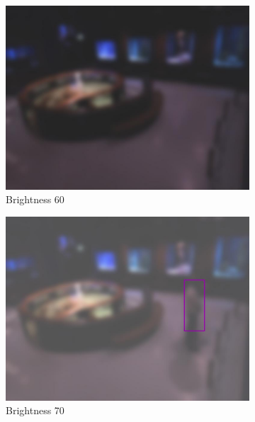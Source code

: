 \begin{figure}[H]
    \centering
    \begin{subfigure}{0.30\textwidth}
        \centering
        \includegraphics[width=\textwidth]{Images/DeviceImages/1st-iteration/hallvard-090224-141936-0-bright60.jpg}
        \caption{Brightness 60}
    \end{subfigure}
    \hfill
    \begin{subfigure}{0.30\textwidth}
        \centering
        \includegraphics[width=1\textwidth]{Images/DeviceImages/1st-iteration/hallvard-090224-134417-1-bright70.jpg}
        \caption{Brightness 70}
    \end{subfigure}
    \hfill
    \begin{subfigure}{0.30\textwidth}

\end{subfigure}
\end{figure}
